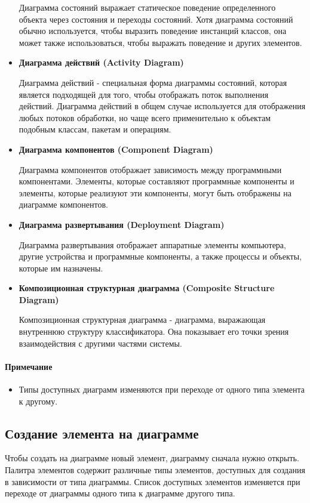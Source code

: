 \documentclass[a4paper,12pt]{report}
\begin{document}
\begin{itemize}
Диаграмма состояний выражает статическое поведение определенного объекта через
состояния и переходы состояний. Хотя диаграмма состояний обычно используется, чтобы
выразить поведение инстанций классов, она может также использоваться, чтобы выражать
поведение и других элементов.
\item \textbf{Диаграмма действий (Activity Diagram)}

Диаграмма действий - специальная форма диаграммы состояний, которая является
подходящей для того, чтобы отображать поток выполнения действий. Диаграмма действий в
общем случае используется для отображения любых потоков обработки, но чаще всего
применительно к объектам подобным классам, пакетам и операциям.
\item \textbf{Диаграмма компонентов (Component Diagram)}

Диаграмма компонентов отображает зависимость между программными компонентами.
Элементы, которые составляют программные компоненты и элементы, которые реализуют
эти компоненты, могут быть отображены на диаграмме компонентов.
\item \textbf{Диаграмма развертывания (Deployment Diagram)}

Диаграмма развертывания отображает аппаратные элементы компьютера, другие
устройства и программные компоненты, а также процессы и объекты, которые им
назначены.
\item \textbf{Композиционная структурная диаграмма (Composite Structure Diagram)}

Композиционная структурная диаграмма - диаграмма, выражающая внутреннюю структуру
классификатора. Она показывает его точки зрения взаимодействия с другими частями
системы.

\end{itemize}
\paragraph*{Примечание}
\begin{itemize}
	\item Типы доступных диаграмм изменяются при переходе от одного типа элемента к другому.
\end{itemize}
\subsection*{Создание элемента на диаграмме}
Чтобы создать на диаграмме новый элемент, диаграмму сначала нужно открыть. Палитра
элементов содержит различные типы элементов, доступных для создания в зависимости от типа
диаграммы. Список доступных элементов изменяется при переходе от диаграммы одного типа к
диаграмме другого типа.
\end{document}

